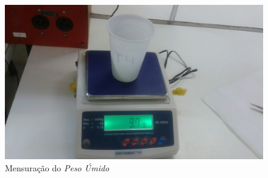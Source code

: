 \documentclass[a4paper,12pt,notitlepage]{article}
\begin{document}
\begin{figure}
    \centering
    \includegraphics[width=\textwidth]{foto5}
    \caption{Mensuração do \textit{Peso Úmido}}
    \label{fig:foto5}
\end{figure}
\end{document}

